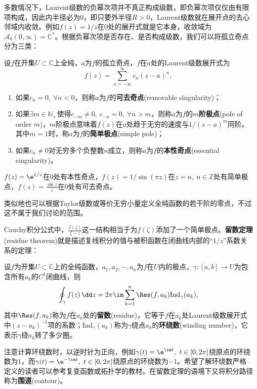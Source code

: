 多数情况下，Laurent级数的负幂次项并不真正构成级数，即负幂次项仅仅由有限项构成，因此内半径必为$0$，即只要外半径$R>0$，Laurent级数就在展开点的去心邻域内收敛。例如$f(z)=1/z$在$0$处的展开式就是它本身，收敛域为$\mathcal{A}_0(0,\infty)=\mathbb{C}^*$。根据负幂次项是否存在、是否构成级数，我们可以将孤立奇点分为三类：
\begin{definition}[孤立奇点的分类]\label{def:singular_point}
    设$f$在开集$U\subset\mathbb{C}$上全纯，$a$为$f$的孤立奇点，$f$在$a$处的Laurent级数展开式为
    \begin{equation}
        f(z)=\sum_{n=-\infty}^{\infty}c_n(z-a)^n,
    \end{equation}
    \begin{enumerate}
        \item 如果$c_n=0,\ \forall n<0$，则称$a$为$f$的\textbf{可去奇点}(removable singularity)；
        \item 如果$\exists m\in\mathbb{N}_+$使得$c_{-m}\neq 0,\ c_{-n}=0,\ \forall n>m$，则称$a$为$f$的\textbf{$m$阶极点}(pole of order $m$)，$m$阶极点意味着$f(z)$在$a$处趋于无穷的速度与$1/(z-a)^m$同阶。
        其中$m=1$时，称$a$为$f$的\textbf{简单极点}(simple pole)；
        \item 如果$c_n\neq 0$对无穷多个负整数$n$成立，则称$a$为$f$的\textbf{本性奇点}(essential singularity)。
    \end{enumerate}
\end{definition}
\begin{example}
    $f(z)=\e^{1/z}$在$0$处有本性奇点，$f(z)=1/\sin(\pi z)$在$z=n,\ n\in\mathbb{Z}$处有简单极点，$\displaystyle f(z)=\frac{\sin z}{z}$在$0$处有可去奇点。
\end{example}

类似地也可以根据Taylor级数或等价无穷小量定义全纯函数的若干阶的零点，不过这不属于我们讨论的范围。

Cauchy积分公式中，$\displaystyle\frac{f(\zeta)}{\zeta-z}$这一结构相当于为$f(\zeta)$添加了一个简单极点。\textbf{留数定理}(residue theorem)就是描述复线积分的值与被积函数在闭曲线内部的“$1/z$”系数关系的定理：
\begin{theorem}[留数定理]
    设$f$为开集$U\subset\mathbb{C}$上的全纯函数，$a_1,a_2,\cdots,a_n$为$f$在$U$内的极点，$\gamma:[a,b]\to U$为包含所有$a_k$的$C^1$闭曲线，则
    \begin{equation}
        \oint_{\gamma}f(z)\,\dd z=2\pi\im\sum_{k=1}^{n}\Res(f,a_k)\mathrm{Ind}_{\gamma}(a_k),
    \end{equation}
    其中$\Res(f,a_k)$称为$f$在$a_k$处的\textbf{留数}(residue)，它等于$f$在$a_k$处Laurent级数展开式中$(z-a_k)^{-1}$项的系数；$\mathrm{Ind}_{\gamma}(a_k)$称为$\gamma$绕点$a_k$的\textbf{环绕数}(winding number)，它表示$\gamma$绕$a_k$转了多少圈。
\end{theorem}
注意计算环绕数时，以逆时针为正向，例如$\gamma(t)=\e^{\im t},\ t\in[0,2\pi]$绕原点的环绕数为$1$，而$\gamma(t)=\e^{-\im t},\ t\in[0,2\pi]$绕原点的环绕数为$-1$。希望了解环绕数严格定义的读者可以参考复变函数或拓扑学的教材。在留数定理的语境下又将积分路径称为\textbf{围道}(contour)。

